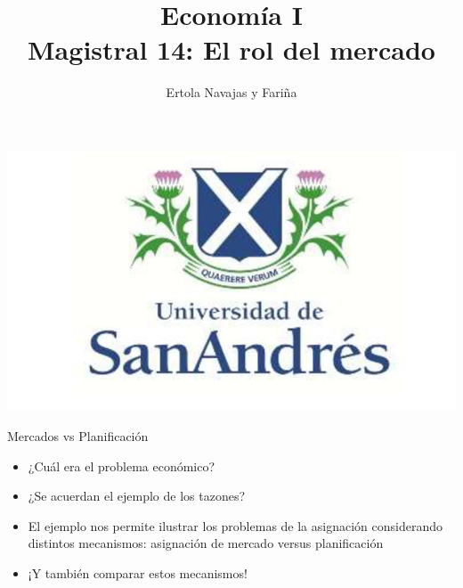 \documentclass{beamer}
\title[Economía I]{Economía I \vspace{4mm}
\\ Magistral 14: El rol del mercado}
\date{}
\author[Ertola Navajas y Fariña]{Ertola Navajas y Fariña}
\institute[]{Universidad de San Andrés}
\begin{document}
\begin{frame}
\titlepage
\centering
\includegraphics[scale=0.2]{../Figures/logoUDESA.jpg} 
\end{frame}

\begin{frame}{Mercados vs Planificación}
    
    \begin{itemize}
        \item ¿Cuál era el problema económico?
        \item ¿Se acuerdan el ejemplo de los tazones? 
        \vspace{1mm}
        \item El ejemplo nos permite ilustrar los problemas de la asignación considerando distintos mecanismos: asignación de mercado versus planificación
        \vspace{1mm}
        \item ¡Y también comparar estos mecanismos! 
    \end{itemize}
\end{frame}
\end{document}
